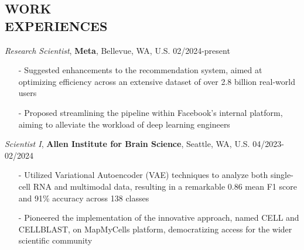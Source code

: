 \documentclass[margin]{res}
\begin{document}
\begin{resume}

\vspace{-1em}
\section{WORK \\ EXPERIENCES}
				{\it Research Scientist}, \textbf{Meta}, Bellevue, WA, U.S. \hfill 02/2024-present
                \begin{itemize}\itemsep -2.2pt %
                \item[-] Suggested enhancements to the recommendation system, aimed at optimizing efficiency across an extensive dataset of over 2.8 billion real-world users
                \item[-] Proposed streamlining the pipeline within Facebook's internal platform, aiming to alleviate the workload of deep learning engineers
                 \end{itemize}
                 
                 \vspace{-1em}
				{\it Scientist I}, \textbf{Allen Institute for Brain Science}, Seattle, WA, U.S. \hfill 04/2023-02/2024
                \begin{itemize}\itemsep -2.2pt %
                \item[-] Utilized Variational Autoencoder (VAE) techniques to analyze both single-cell RNA and multimodal data, resulting in a remarkable 0.86 mean F1 score and 91\% accuracy across 138 classes
                \item[-] Pioneered the implementation of the innovative approach, named CELL and CELLBLAST, on MapMyCells platform, democratizing access for the wider scientific community                 
                \end{itemize}


\end{resume}
\end{document}
